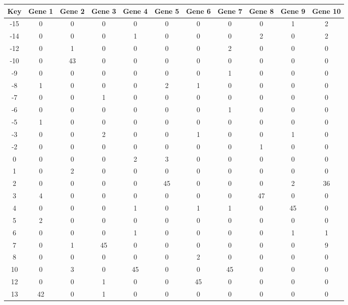 \begin{tabular}{|c|c|c|c|c|c|c|c|c|c|c|}
\hline
Key & Gene 1 & Gene 2 & Gene 3 & Gene 4 & Gene 5 & Gene 6 & Gene 7 & Gene 8 & Gene 9 & Gene 10 \\
\hline
-15 & 0 & 0 & 0 & 0 & 0 & 0 & 0 & 0 & 1 & 2 \\
-14 & 0 & 0 & 0 & 1 & 0 & 0 & 0 & 2 & 0 & 2 \\
-12 & 0 & 1 & 0 & 0 & 0 & 0 & 2 & 0 & 0 & 0 \\
-10 & 0 & 43 & 0 & 0 & 0 & 0 & 0 & 0 & 0 & 0 \\
-9 & 0 & 0 & 0 & 0 & 0 & 0 & 1 & 0 & 0 & 0 \\
-8 & 1 & 0 & 0 & 0 & 2 & 1 & 0 & 0 & 0 & 0 \\
-7 & 0 & 0 & 1 & 0 & 0 & 0 & 0 & 0 & 0 & 0 \\
-6 & 0 & 0 & 0 & 0 & 0 & 0 & 1 & 0 & 0 & 0 \\
-5 & 1 & 0 & 0 & 0 & 0 & 0 & 0 & 0 & 0 & 0 \\
-3 & 0 & 0 & 2 & 0 & 0 & 1 & 0 & 0 & 1 & 0 \\
-2 & 0 & 0 & 0 & 0 & 0 & 0 & 0 & 1 & 0 & 0 \\
0 & 0 & 0 & 0 & 2 & 3 & 0 & 0 & 0 & 0 & 0 \\
1 & 0 & 2 & 0 & 0 & 0 & 0 & 0 & 0 & 0 & 0 \\
2 & 0 & 0 & 0 & 0 & 45 & 0 & 0 & 0 & 2 & 36 \\
3 & 4 & 0 & 0 & 0 & 0 & 0 & 0 & 47 & 0 & 0 \\
4 & 0 & 0 & 0 & 1 & 0 & 1 & 1 & 0 & 45 & 0 \\
5 & 2 & 0 & 0 & 0 & 0 & 0 & 0 & 0 & 0 & 0 \\
6 & 0 & 0 & 0 & 1 & 0 & 0 & 0 & 0 & 1 & 1 \\
7 & 0 & 1 & 45 & 0 & 0 & 0 & 0 & 0 & 0 & 9 \\
8 & 0 & 0 & 0 & 0 & 0 & 2 & 0 & 0 & 0 & 0 \\
10 & 0 & 3 & 0 & 45 & 0 & 0 & 45 & 0 & 0 & 0 \\
12 & 0 & 0 & 1 & 0 & 0 & 45 & 0 & 0 & 0 & 0 \\
13 & 42 & 0 & 1 & 0 & 0 & 0 & 0 & 0 & 0 & 0 \\
\hline
\end{tabular}